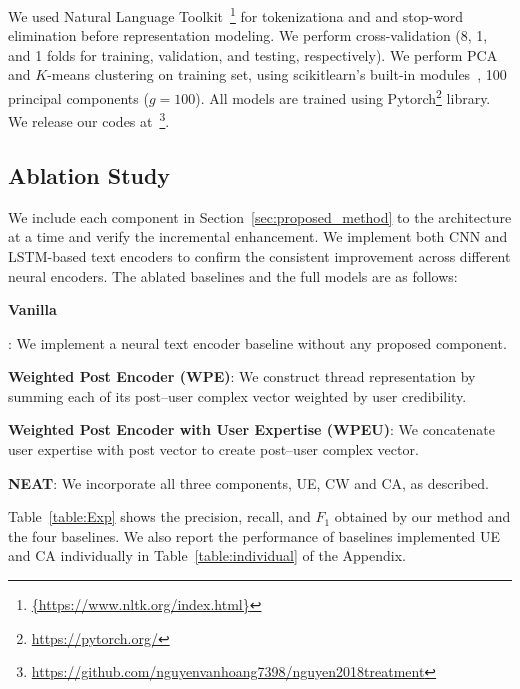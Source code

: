 \documentclass{bmcart}
\begin{document}
We used Natural Language Toolkit~\footnote{\scriptsize{\url{{https://www.nltk.org/index.html}}}} for tokenizationa and and stop-word elimination before representation modeling. 
We perform cross-validation (8, 1, and 1 folds for training, validation, and testing, respectively). We perform PCA and $K$-means clustering on training set, using scikitlearn's built-in modules~\cite{scikit-learn}, 
100 principal components ($g=100$). All models are trained using Pytorch\footnote{\scriptsize{\url{https://pytorch.org/}}} library. We release our codes at~\footnote{\scriptsize{\url{https://github.com/nguyenvanhoang7398/nguyen2018treatment}}}.

\subsection{Ablation Study}

We include each component in Section~\ref{sec:proposed_method} to the architecture at a time and verify the incremental enhancement. We implement both CNN and LSTM-based text encoders to confirm the consistent improvement across different neural encoders. The ablated baselines and the full models are as follows: 

\begin{itemize}
  {\item{\textbf{Vanilla}}}: We implement a neural text encoder baseline without any proposed component.
  
\item{\textbf{Weighted Post Encoder (WPE)}}: We construct thread representation by summing each of its post--user complex vector weighted by user credibility.

\item{\textbf{Weighted Post Encoder with User Expertise (WPEU)}}: We concatenate user expertise with post vector to create post--user complex vector.

\item{\textbf{NEAT}}: We incorporate all three components, UE, CW and CA, as described.

\end{itemize}


Table~\ref{table:Exp} shows the precision, recall, and $F_{1}$ obtained by our method and the four baselines. We also report the performance of baselines implemented UE and CA individually in Table~\ref{table:individual} of the Appendix.
\end{document}
